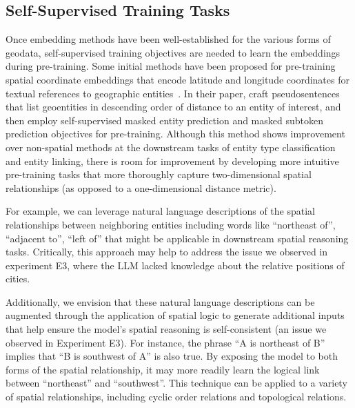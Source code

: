 


\subsection{Self-Supervised Training Tasks}
Once embedding methods have been well-established for the various forms of geodata, self-supervised training objectives are needed to learn the embeddings during pre-training.
%
Some initial methods have been proposed for pre-training spatial coordinate embeddings that encode latitude and longitude coordinates for textual references to geographic entities~\cite{Li2021}.
In their paper, \citeauthor{Li2021} craft pseudosentences that list geoentities in descending order of distance to an entity of interest, and then employ self-supervised masked entity prediction and masked subtoken prediction objectives for pre-training.
Although this method shows improvement over non-spatial methods at the downstream tasks of entity type classification and entity linking, there is room for improvement by developing more intuitive pre-training tasks that more thoroughly capture two-dimensional spatial relationships (as opposed to a one-dimensional distance metric).

For example, we can leverage natural language descriptions of the spatial relationships between neighboring entities including words like ``northeast of'', ``adjacent to'', ``left of'' that might be applicable in downstream spatial reasoning tasks.
Critically, this approach may help to address the issue we observed in experiment E3, where the LLM lacked knowledge about the relative positions of cities.

Additionally, we envision that these natural language descriptions can be augmented through the application of spatial logic to generate additional inputs that help ensure the model's spatial reasoning is self-consistent (an issue we observed in Experiment E3).
For instance, the phrase ``A is northeast of B'' implies that ``B is southwest of A'' is also true.
By exposing the model to both forms of the spatial relationship, it may more readily learn the logical link between ``northeast'' and ``southwest''.
This technique can be applied to a variety of spatial relationships, including cyclic order relations and topological relations.




